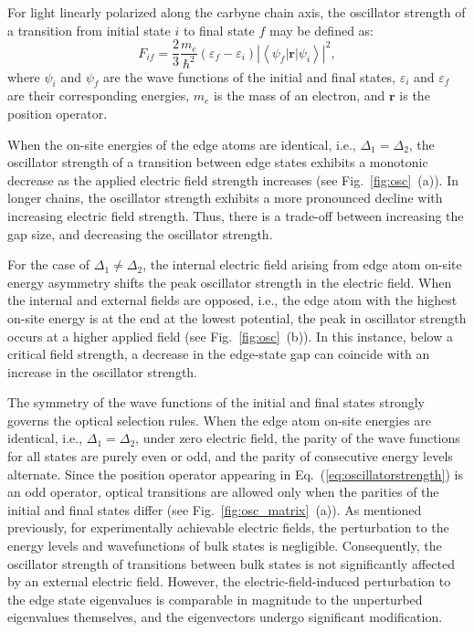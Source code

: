 \documentclass[
preprint,
 amsmath,amssymb,
 aps,
]{revtex4-2}
\begin{document}
For light linearly polarized along the carbyne chain axis, the oscillator strength of a transition from initial state $i$ to final state $f$ may be defined as: 
\begin{equation}
   F_{if}=\frac{2}{3}\frac{m_{e}}{\hbar^{2}}\left(\varepsilon_{f}-\varepsilon_{i}\right)\left|\left\langle \psi_{f}\left|\boldsymbol{r}\right|\psi_{i}\right\rangle \right|^{2},
    \label{eq:oscillatorstrength}
\end{equation}
where $\psi_{i}$ and $\psi_{f}$ are the wave functions of the initial and final states, $\varepsilon_i$ and $\varepsilon_f$ are their corresponding energies, $m_e$ is the mass of an electron, %
and $\boldsymbol{r}$ is the position operator.  

When the on-site energies of the edge atoms are identical, i.e., $\Delta_1=\Delta_2$, the oscillator strength of a transition between edge states exhibits a monotonic decrease as the applied electric field strength increases (see Fig.~\ref{fig:osc}~(a)). In longer chains, the oscillator strength exhibits a more pronounced decline with increasing electric field strength. Thus, there is a trade-off between increasing the gap size, and decreasing the oscillator strength.

For the case of $\Delta_1\neq\Delta_2$, the internal electric field arising from edge atom on-site energy asymmetry shifts the peak oscillator strength in the electric field. When the internal and external fields are opposed, i.e., the edge atom with the highest on-site energy is at the end at the lowest potential, the peak in oscillator strength occurs at a higher applied field (see Fig.~\ref{fig:osc}~(b)). In this instance, below a critical field strength, a decrease in the edge-state gap can coincide with an increase in the oscillator strength. 

The symmetry of the wave functions of the initial and final states strongly governs the optical selection rules. When the edge atom on-site energies are identical, i.e., $\Delta_1=\Delta_2$, under zero electric field, the parity of the wave functions for all states are purely even or odd, and the parity of consecutive energy levels alternate. Since the position operator appearing in Eq.~(\ref{eq:oscillatorstrength}) is an odd operator, optical transitions are allowed only when the parities of the initial and final states differ (see Fig.~\ref{fig:osc_matrix}~(a)). As mentioned previously, for experimentally achievable electric fields, the perturbation to the energy levels and wavefunctions of bulk states is negligible. Consequently, the oscillator strength of transitions between bulk states is not significantly affected by an external electric field. However, the electric-field-induced perturbation to the edge state eigenvalues is comparable in magnitude to the unperturbed eigenvalues themselves, and the eigenvectors undergo significant modification. 
\end{document}
